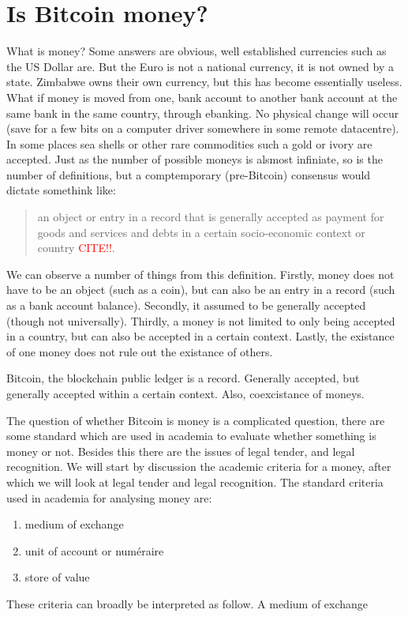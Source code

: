 
\chapter{Is Bitcoin money?}

What is money? Some answers are obvious, well established currencies
such as the US Dollar are. But the Euro is not a national currency,
it is not owned by a state. Zimbabwe owns their own currency, but
this has become essentially useless. What if money is moved from one,
bank account to another bank account at the same bank in the same
country, through ebanking. No physical change will occur (save for
a few bits on a computer driver somewhere in some remote datacentre).
In some places sea shells or other rare commodities such a gold or
ivory are accepted. Just as the number of possible moneys is alsmost
infiniate, so is the number of definitions, but a comptemporary (pre-Bitcoin)
consensus would dictate somethink like: 
\begin{quotation}
an object or entry in a record that is generally accepted as payment
for goods and services and debts in a certain socio-economic context
or country \textcolor{red}{CITE!!}.
\end{quotation}
We can observe a number of things from this definition. Firstly, money
does not have to be an object (such as a coin), but can also be an
entry in a record (such as a bank account balance). Secondly, it assumed
to be generally accepted (though not universally). Thirdly, a money
is not limited to only being accepted in a country, but can also be
accepted in a certain context. Lastly, the existance of one money
does not rule out the existance of others.

Bitcoin, the blockchain public ledger is a record. Generally accepted,
but generally accepted within a certain context. Also, coexcistance
of moneys.

The question of whether Bitcoin is money is a complicated question,
there are some standard which are used in academia to evaluate whether
something is money or not. Besides this there are the issues of legal
tender, and legal recognition. We will start by discussion the academic
criteria for a money, after which we will look at legal tender and
legal recognition. The standard criteria used in academia for analysing
money are:
\begin{enumerate}
\item medium of exchange
\item unit of account or numéraire
\item store of value
\end{enumerate}
These criteria can broadly be interpreted as follow. A medium of exchange

